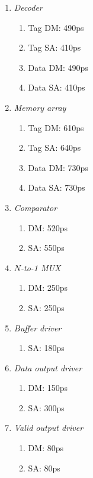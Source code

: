 \documentclass[11pt]{article}
\begin{document}

\begin{enumerate}[i]
			\item \textit{Decoder}
				\begin{enumerate}[i]
					\item Tag DM: 490ps
					\item Tag SA: 410ps
					\item Data DM: 490ps
					\item Data SA: 410ps					
				\end{enumerate}
			\item \textit{Memory array}
				\begin{enumerate}[i]
					\item Tag DM: 610ps
					\item Tag SA: 640ps
					\item Data DM: 730ps
					\item Data SA: 730ps		
				\end{enumerate}
			\item \textit{Comparator}
				\begin{enumerate}[i]
					\item DM: 520ps
					\item SA: 550ps
				\end{enumerate}
			\item \textit{$N$-to-1 MUX}
				\begin{enumerate}[i]
					\item DM: 250ps
					\item SA: 250ps
				\end{enumerate}
			\item \textit{Buffer driver}
				\begin{enumerate}[i]
					\item SA: 180ps
				\end{enumerate}
			\item \textit{Data output driver}
				\begin{enumerate}[i]
					\item DM: 150ps
					\item SA: 300ps
				\end{enumerate}
			\item \textit{Valid output driver}
				\begin{enumerate}[i]
					\item DM: 80ps
					\item SA: 80ps
				\end{enumerate}
		\end{enumerate}
\end{document}
